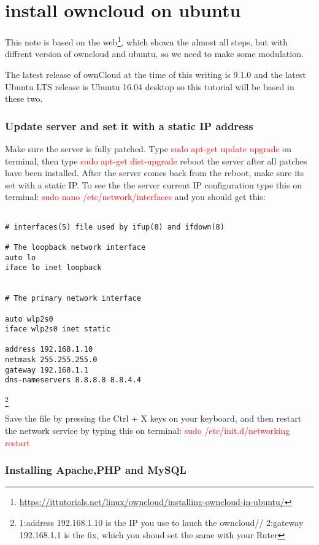 \chapter{install owncloud on ubuntu}
This note is based on the web\footnote{\url{https://ittutorials.net/linux/owncloud/installing-owncloud-in-ubuntu/}}, which shown the almost all steps, but with diffrent version of owncloud and ubuntu, so we need to make some modulation. 

The latest release of ownCloud at the time of this writing is 9.1.0 and the latest Ubuntu LTS release is Ubuntu 16.04 desktop so this tutorial will be based in these two.

\subsection{Update server and set it with a static IP address}

Make sure the server is fully patched. Type \textcolor{red}{sudo apt-get update upgrade} on terminal, then type \textcolor{red}{sudo apt-get dist-upgrade}  reboot the server after all patches have been installed. After the server comes back from the reboot, make sure its set with a static IP.  To see the the server current IP configuration type this on terminal: \textcolor{red}{sudo nano /etc/network/interfaces} and you should get this:

\begin{verbatim}

# interfaces(5) file used by ifup(8) and ifdown(8)

# The loopback network interface
auto lo
iface lo inet loopback


# The primary network interface

auto wlp2s0
iface wlp2s0 inet static

address 192.168.1.10
netmask 255.255.255.0
gateway 192.168.1.1
dns-nameservers 8.8.8.8 8.8.4.4
\end{verbatim}
\footnote{1:address 192.168.1.10 is the IP you use to lauch the owncloud// 2:gateway 192.168.1.1 is the fix, which you shoud set the same with your Ruter}

Save the file by pressing the Ctrl + X keys on your keyboard, and then restart the network service by typing this on terminal: \textcolor{red}{sudo /etc/init.d/networking restart}

\subsection{Installing Apache,PHP and MySQL}

